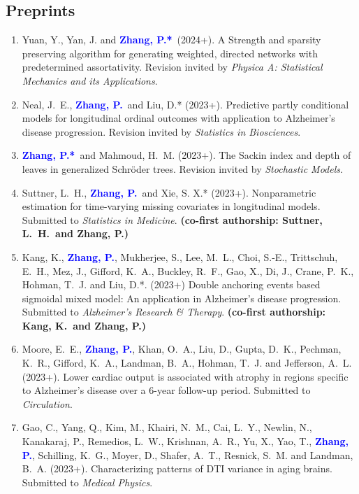 \documentclass[12pt]{article}
\newcommand{\PZ}{\textcolor{blue}{\textbf{Zhang, P.*}}}
\newcommand{\PZnot}{\textcolor{blue}{\textbf{Zhang, P.}}}
\begin{document}
	\subsection*{Preprints}
	\begin{enumerate}	
		\item {\sc Yuan, Y., Yan, J.} and \PZ\ (2024+). A Strength 
		and sparsity preserving algorithm for generating weighted, 
		directed networks with predetermined assortativity. Revision 
		invited by {\em Physica A: Statistical Mechanics and its 
		Applications}.
		
		\item {\sc Neal, J.\ E.}, \PZnot\ and {\sc Liu, D.*} 
		(2023+). 
		Predictive partly conditional models for longitudinal 
		ordinal outcomes with application to Alzheimer's disease
		progression. Revision invited by {\em Statistics in 
		Biosciences}.
		
		\item \PZ\ and {\sc Mahmoud, H.\ M.} (2023+). The Sackin 
		index 
		and depth of leaves in generalized Schr\"{o}der trees. 
		Revision invited by {\em Stochastic Models}.
				
		\item {\sc Suttner, L.\ H.,} \PZnot\ and {\sc Xie, S. X.*} 
		(2023+). Nonparametric estimation for time-varying missing 
		covariates in longitudinal models. Submitted to {\em 
		Statistics in Medicine}. {\bf (co-first authorship: Suttner, 
		L.\ H.\ and Zhang, P.)}
	
		\item {\sc Kang, K.}, \PZnot, {\sc Mukherjee, S., Lee, M.\ 
		L., Choi, S.-E., Trittschuh, E.\ H., Mez, J., Gifford, K.\ 
		A., Buckley, R.\ F., Gao, X., Di, J., Crane, P.\ K., Hohman, 
		T.\ J.} and {\sc Liu, D.*}. (2023+) Double anchoring events 
		based sigmoidal mixed model: An application in Alzheimer's 
		disease progression. Submitted to {\em Alzheimer's Research 
		\& Therapy}. {\bf (co-first authorship: Kang, K.\ and Zhang, 
		P.)}
		
		\item {\sc Moore, E.\ E.,} \PZnot, {\sc Khan, O.\ A., Liu, 
		D., Gupta, D.\ K., Pechman, K.\ R., Gifford, K.\ A., 
		Landman, B.\ A., Hohman, T.\ J.} and {\sc Jefferson, A.\ 
		L.} (2023+). Lower cardiac output is associated with atrophy 
		in regions specific to Alzheimer’s disease over a 6-year 
		follow-up period. Submitted to {\em Circulation}.
		
		\item {\sc Gao, C., Yang, Q., Kim, M., Khairi, N.\ M., Cai, 
		L.\ Y., Newlin, N., Kanakaraj, P., Remedios, L.\ W., 
		Krishnan, A.\ R., Yu, X., Yao, T.,} \PZnot, {\sc Schilling, 
		K.\ G., Moyer, D., Shafer, A.\ T., Resnick, S.\ M.} and {\sc 
		Landman, B.\ A.} (2023+). Characterizing patterns of DTI 
		variance in aging brains. Submitted to {\em Medical Physics}.
	\end{enumerate}
	
\end{document}

